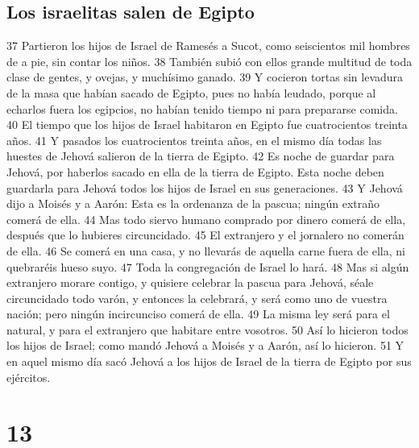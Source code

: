 \section*{Los israelitas salen de Egipto}
37 Partieron los hijos de Israel de Ramesés a Sucot, como seiscientos mil hombres de a pie, sin contar los niños.
38 También subió con ellos grande multitud de toda clase de gentes, y ovejas, y muchísimo ganado.
39 Y cocieron tortas sin levadura de la masa que habían sacado de Egipto, pues no había leudado, porque al echarlos fuera los egipcios, no habían tenido tiempo ni para prepararse comida.
40 El tiempo que los hijos de Israel habitaron en Egipto fue cuatrocientos treinta años.
41 Y pasados los cuatrocientos treinta años, en el mismo día todas las huestes de Jehová salieron de la tierra de Egipto.
42 Es noche de guardar para Jehová, por haberlos sacado en ella de la tierra de Egipto. Esta noche deben guardarla para Jehová todos los hijos de Israel en sus generaciones.
43 Y Jehová dijo a Moisés y a Aarón: Esta es la ordenanza de la pascua; ningún extraño comerá de ella.
44 Mas todo siervo humano comprado por dinero comerá de ella, después que lo hubieres circuncidado.
45 El extranjero y el jornalero no comerán de ella.
46 Se comerá en una casa, y no llevarás de aquella carne fuera de ella, ni quebraréis hueso suyo.
47 Toda la congregación de Israel lo hará.
48 Mas si algún extranjero morare contigo, y quisiere celebrar la pascua para Jehová, séale circuncidado todo varón, y entonces la celebrará, y será como uno de vuestra nación; pero ningún incircunciso comerá de ella.
49 La misma ley será para el natural, y para el extranjero que habitare entre vosotros.
50 Así lo hicieron todos los hijos de Israel; como mandó Jehová a Moisés y a Aarón, así lo hicieron.
51 Y en aquel mismo día sacó Jehová a los hijos de Israel de la tierra de Egipto por sus ejércitos.

\chapter{13}

